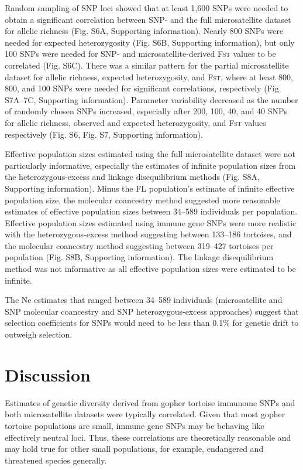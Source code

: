 \documentclass[english]{article}\usepackage[]{graphicx}\usepackage[]{color}
\begin{document}
Random sampling of SNP loci showed that at least 1,600 SNPs were needed to obtain a significant correlation between SNP- and the full microsatellite dataset for allelic richness (Fig. S6A, Supporting information). Nearly 800 SNPs were needed for expected heterozygosity (Fig. S6B, Supporting information), but only 100 SNPs were needed for SNP- and microsatellite-derived \textsc{Fst} values to be correlated (Fig. S6C). There was a similar pattern for the partial microsatellite dataset for allelic richness, expected heterozygosity, and \textsc{Fst}, where at least 800, 800, and 100 SNPs were needed for significant correlations, respectively (Fig. S7A--7C, Supporting information). Parameter variability decreased as the number of randomly chosen SNPs increased, especially after 200, 100, 40, and 40 SNPs for allelic richness, observed and expected heterozygosity, and \textsc{Fst} values respectively (Fig. S6, Fig. S7, Supporting information).

Effective population sizes estimated using the full microsatellite dataset were not particularly informative, especially the estimates of infinite population sizes from the heterozygous-excess and linkage disequilibrium methods (Fig. S8A, Supporting information). Minus the FL population's estimate of infinite effective population size, the molecular coancestry method suggested more reasonable estimates of effective population sizes between 34--589 individuals per population. Effective population sizes estimated using immune gene SNPs were more realistic with the heterozygous-excess method suggesting between 133--186 tortoises, and the molecular coancestry method suggesting between 319--427 tortoises per population (Fig. S8B, Supporting information). The linkage disequilibrium method was not informative as all effective population sizes were estimated to be infinite.

The Ne estimates that ranged between 34--589 individuals (microsatellite and SNP molecular coancestry and SNP heterozygous-excess approaches) suggest that selection coefficients for SNPs would need to be less than 0.1\% for genetic drift to outweigh selection.

\section*{Discussion}
Estimates of genetic diversity derived from gopher tortoise immunome SNPs and both microsatellite datasets were typically correlated. Given that most gopher tortoise populations are small, immune gene SNPs may be behaving like effectively neutral loci. Thus, these correlations are theoretically reasonable and may hold true for other small populations, for example, endangered and threatened species generally.
\end{document}
